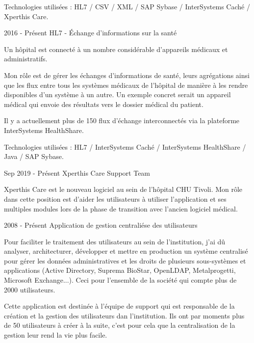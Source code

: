 \begin{cventries}
{    Technologies utilisées : HL7 / CSV / XML / SAP Sybase / InterSystems Caché / Xperthis Care.

    }
    
  \cventry
    {2016 - Présent} %
    {HL7 - Échange d'informations sur la santé} %
    {} %
    {} %
    {
    Un hôpital est connecté à un nombre considérable d'appareils médicaux et administratifs. 
    
    Mon rôle est de gérer les échanges d'informations de santé, leurs agrégations ainsi que les flux entre tous les systèmes médicaux de l'hôpital de manière à les rendre disponibles d'un système à un autre.
    Un exemple concret serait un appareil médical qui envoie des résultats vers le dossier médical du patient. 
    
    Il y a actuellement plus de 150 flux d'échange interconnectés via la plateforme InterSystems HealthShare. 

    Technologies utilisées : HL7 / InterSystems Caché / InterSystems HealthShare / Java / SAP Sybase.

    }
    

  \cventry
    {Sep 2019 - Présent} %
    {Xperthis Care Support Team} %
    {} %
    {} %
    {
    Xperthis Care est le nouveau logiciel au sein de l'hôpital CHU Tivoli. Mon rôle dans cette position est d'aider les utilisateurs à utiliser l'application et ses multiples modules lors de la phase de transition avec l'ancien logiciel médical.

    }
    
  \cventry
    {2008 - Présent} %
    {Application de gestion centraliése des utilisateurs} %
    {} %
    {} %
    {
    Pour faciliter le traitement des utilisateurs au sein de l'institution, j'ai dû analyser, architecturer, développer et mettre en production un système centralisé pour gérer les données administratives et les droits de plusieurs sous-systèmes et applications (Active Directory, Suprema BioStar, OpenLDAP, Metalprogetti, Microsoft Exchange...). Ceci pour l'ensemble de la société qui compte plus de 2000 utilisateurs.
    
    Cette application est destinée à l'équipe de support qui est responsable de la création et la gestion des utilisateurs dan l'institution. Ils ont par moments plus de 50 utilisateurs à créer à la suite, c'est pour cela que la centralisation de la gestion leur rend la vie plus facile. 
    
}
\end{cventries}

